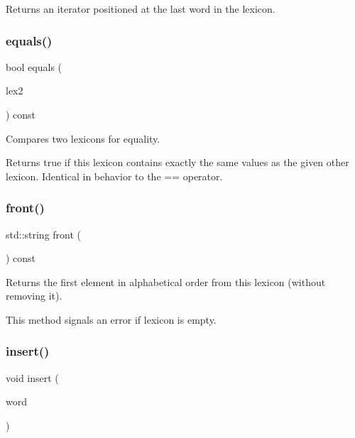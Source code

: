 Returns an iterator positioned at the last word in the lexicon. 

\mbox{\label{classDawgLexicon_a548d3aa2e2086be0f8db9868d5dfd6e1}} 
\subsubsection{\texorpdfstring{equals()}{equals()}}
{\footnotesize\ttfamily bool equals (\begin{DoxyParamCaption}\item[{const \mbox{\hyperlink{classDawgLexicon}{Dawg\+Lexicon}} \&}]{lex2 }\end{DoxyParamCaption}) const}



Compares two lexicons for equality. 

Returns {\ttfamily true} if this lexicon contains exactly the same values as the given other lexicon. Identical in behavior to the == operator. \mbox{\label{classDawgLexicon_a054217ec9f3229ceedee9d7bde075587}} 
\subsubsection{\texorpdfstring{front()}{front()}}
{\footnotesize\ttfamily std\+::string front (\begin{DoxyParamCaption}{ }\end{DoxyParamCaption}) const}



Returns the first element in alphabetical order from this lexicon (without removing it). 

This method signals an error if lexicon is empty. \mbox{\label{classDawgLexicon_a1a017af6eb755b5c83e70f61e2bda2c7}} 
\subsubsection{\texorpdfstring{insert()}{insert()}}
{\footnotesize\ttfamily void insert (\begin{DoxyParamCaption}\item[{const std\+::string \&}]{word }\end{DoxyParamCaption})}



